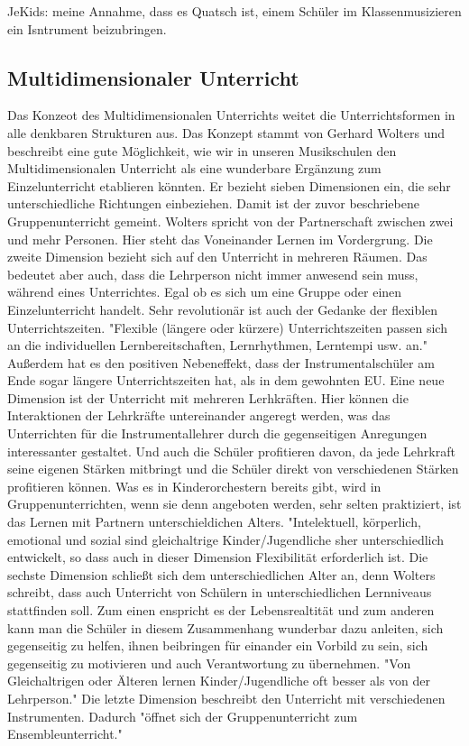 JeKids: meine Annahme, dass es Quatsch ist, einem Schüler im Klassenmusizieren
ein Isntrument beizubringen.




\subsection{Multidimensionaler Unterricht} 
Das Konzeot des Multidimensionalen Unterrichts weitet die Unterrichtsformen in
alle denkbaren Strukturen aus. Das Konzept stammt von Gerhard Wolters und
beschreibt eine gute Möglichkeit, wie wir in unseren Musikschulen den
Multidimensionalen Unterricht als eine wunderbare Ergänzung zum Einzelunterricht
etablieren könnten. Er bezieht sieben Dimensionen ein, die sehr unterschiedliche
Richtungen einbeziehen. \autocite[86ff]{ernst:die_zukunftsfaehige_musikschule} Damit
ist der zuvor beschriebene Gruppenunterricht gemeint. Wolters
spricht von der Partnerschaft zwischen zwei und mehr Personen. Hier steht das
Voneinander Lernen im Vordergrung. Die zweite Dimension bezieht sich auf den
Unterricht in mehreren Räumen. Das bedeutet aber auch, dass die Lehrperson nicht
immer anwesend sein muss, während eines Unterrichtes. Egal ob es sich um eine
Gruppe oder einen Einzelunterricht handelt. Sehr revolutionär ist auch der
Gedanke der flexiblen Unterrichtszeiten. "Flexible (längere oder kürzere)
Unterrichtszeiten passen sich an die individuellen Lernbereitschaften,
Lernrhythmen, Lerntempi usw. an."
\autocite[87]{ernst:die_zukunftsfaehige_musikschule} Außerdem hat es den
positiven Nebeneffekt, dass der Instrumentalschüler am Ende sogar längere
Unterrichtszeiten hat, als in dem gewohnten EU. Eine neue Dimension ist der
Unterricht mit mehreren Lerhkräften. Hier können die Interaktionen der
Lehrkräfte untereinander angeregt werden, was das Unterrichten für die
Instrumentallehrer durch die gegenseitigen Anregungen interessanter gestaltet.
Und auch die Schüler profitieren davon, da jede Lehrkraft seine eigenen Stärken
mitbringt und die Schüler direkt von verschiedenen Stärken profitieren können.
Was es in Kinderorchestern bereits gibt, wird in Gruppenunterrichten, wenn sie
denn angeboten werden, sehr selten praktiziert, ist das Lernen mit Partnern
unterschieldichen Alters. "Intelektuell, körperlich, emotional und sozial sind
gleichaltrige Kinder/Jugendliche sher unterschiedlich entwickelt, so dass auch
in dieser Dimension Flexibilität erforderlich ist. \autocite[87]{ernst:die_zukunftsfaehige_musikschule}
Die sechste Dimension schließt sich dem unterschiedlichen Alter an, denn Wolters
schreibt, dass auch Unterricht von Schülern in unterschiedlichen Lernniveaus
stattfinden soll. Zum einen enspricht es der Lebensrealtität und zum anderen
kann man die Schüler in diesem Zusammenhang wunderbar dazu anleiten, sich
gegenseitig zu helfen, ihnen beibringen für einander ein Vorbild zu sein, sich
gegenseitig zu motivieren und auch Verantwortung zu übernehmen. "Von
Gleichaltrigen oder Älteren lernen Kinder/Jugendliche oft besser als von der
Lehrperson." \autocite[87]{ernst:die_zukunftsfaehige_musikschule} Die letzte
Dimension beschreibt den Unterricht mit verschiedenen Instrumenten. Dadurch
"öffnet sich der Gruppenunterricht zum Ensembleunterricht."
\autocite[87]{ernst:die_zukunftsfaehige_musikschule}
